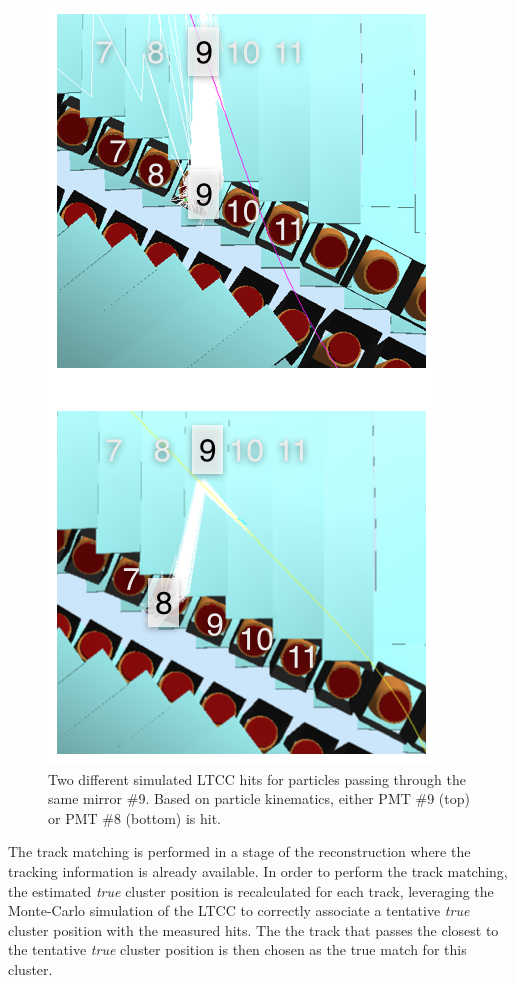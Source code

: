 \begin{figure}
  \centering
  \includegraphics[width=0.95\columnwidth,keepaspectratio]{img/trackmatching.png}
  \caption{Two different simulated LTCC hits for particles passing through the same mirror
  \#9. Based on particle kinematics, either PMT \#9 (top) or PMT \#8 (bottom) is hit.}
  \label{fig:trackmatching}
\end{figure}

The track matching is performed in a stage of the reconstruction where the tracking
information is already available. In order to perform the track matching, the estimated
\textit{true} cluster position is recalculated for each track, leveraging the Monte-Carlo
simulation of the LTCC to correctly associate a tentative \textit{true} cluster position
with the measured hits.
The the track that passes the closest to the tentative \textit{true} cluster position is
then chosen as the true match for this cluster.
